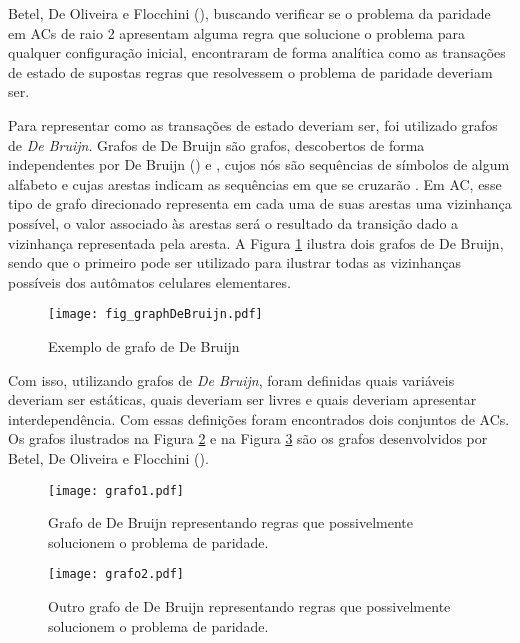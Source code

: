 Betel, De Oliveira e Flocchini (\citeyear{Betel2013}), buscando verificar se o problema da paridade em ACs de raio 2 apresentam alguma regra que solucione o problema para qualquer configuração inicial, encontraram de forma analítica como as transações de estado de supostas regras que resolvessem o problema de paridade deveriam ser. 

Para representar como as transações de estado deveriam ser, foi utilizado grafos de \textit{De Bruijn}. Grafos de De Bruijn são grafos, descobertos de forma independentes por De Bruijn (\citeyear{Bruijn946combinatorial}) e , cujos nós são sequências de símbolos de algum alfabeto e cujas arestas indicam as sequências em que se cruzarão \cite{weisstein2015deBruijn}. Em AC, esse tipo de grafo direcionado representa em cada uma de suas arestas uma vizinhança possível, o valor associado às arestas será o resultado da transição dado a vizinhança representada pela aresta. A Figura \ref{fig:grafosDeBruijnSample} ilustra dois grafos de De Bruijn, sendo que o primeiro pode ser utilizado para ilustrar todas as vizinhanças possíveis dos autômatos celulares elementares.

\begin{figure}[h!]
\centering
\texttt{[image: fig\_graphDeBruijn.pdf]}
\caption{Exemplo de grafo de De Bruijn \cite{Good1946normal}}
\label{fig:grafosDeBruijnSample}
\end{figure}

Com isso, utilizando grafos de \textit{De Bruijn}, foram definidas quais variáveis deveriam ser estáticas, quais deveriam ser livres e quais deveriam apresentar interdependência. Com essas definições foram encontrados dois conjuntos de ACs. Os grafos ilustrados na Figura \ref{fig:grafosDeBruijn} e na Figura \ref{fig:grafosDeBruijn2} são os grafos desenvolvidos por Betel, De Oliveira e Flocchini (\citeyear{Betel2013}).

\begin{figure}[h!]
\centering
\texttt{[image: grafo1.pdf]}
\caption{Grafo de De Bruijn representando regras que possivelmente solucionem o problema de paridade. \cite{Betel2013}}
\label{fig:grafosDeBruijn}
\end{figure}

\begin{figure}[h!]
\centering
\texttt{[image: grafo2.pdf]}
\caption{Outro grafo de De Bruijn representando regras que possivelmente solucionem o problema de paridade.\cite{Betel2013}}
\label{fig:grafosDeBruijn2}
\end{figure}


